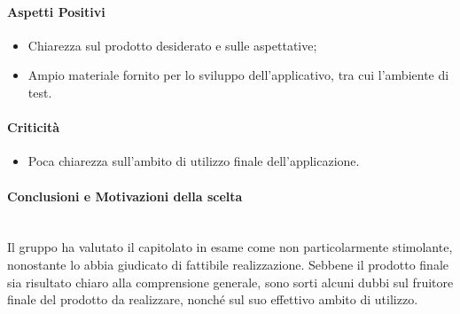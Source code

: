 \paragraph{Aspetti Positivi}
  \begin{itemize}
    \item Chiarezza sul prodotto desiderato e sulle aspettative;
    \item Ampio materiale fornito per lo sviluppo dell'applicativo, tra cui l'ambiente di test.
  \end{itemize}
\paragraph{Criticità}
  \begin{itemize}
    \item Poca chiarezza sull'ambito di utilizzo finale dell'applicazione.
  \end{itemize}

\paragraph{Conclusioni e Motivazioni della scelta}\-\\
Il gruppo ha valutato il capitolato in esame come non particolarmente stimolante, nonostante lo abbia giudicato di fattibile realizzazione. Sebbene il prodotto finale sia risultato chiaro alla comprensione generale, sono sorti alcuni dubbi sul fruitore finale del prodotto da realizzare, nonché sul suo effettivo ambito di utilizzo.
